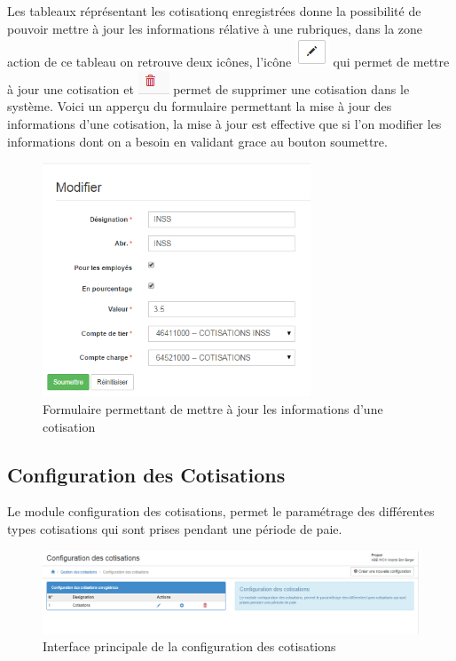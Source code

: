 \documentclass[12pt,a4paper]{report}
\begin{document}
Les tableaux réprésentant les cotisationq enregistrées donne la possibilité de pouvoir mettre à jour les informations rélative à une rubriques, dans la zone action de ce tableau on retrouve deux icônes, l'icône \includegraphics[scale=0.7]{pic/EditBlack.png} qui permet de mettre à jour une cotisation et \includegraphics[scale=0.7]{pic/DeleteWRed.png} permet de supprimer une cotisation dans le système.
Voici un apperçu du formulaire permettant la mise à jour des informations d'une cotisation, la mise à jour est effective que si l'on modifier les informations dont on a besoin en validant grace au bouton soumettre. 
\newpage
\begin{figure}[h]
\begin{center}
\includegraphics[width=8cm]{pic/ModCotisations.png}
\end{center}
\caption{Formulaire permettant de mettre à jour les informations d'une cotisation}
\label{Formulaire permettant de mettre à jour les informations d'une cotisation}
\end{figure} 


\subsection{Configuration des Cotisations}
Le module configuration des cotisations, permet le paramétrage des différentes types cotisations qui sont prises pendant une période de paie.

\begin{figure}[h]
\begin{center}
\includegraphics[width=14cm]{pic/ConfigCotisation.png}
\end{center}
\caption{Interface principale de la configuration des cotisations}
\label{Interface principale de la configuration des cotisations}
\end{figure}
\end{document}
